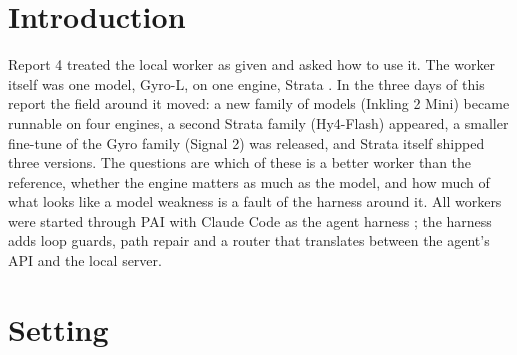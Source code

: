 \clearpage


\tableofcontents
{}
\listoftables
\clearpage

\renewcommand{\sectionmark}[1]{\markboth{\thesection.\ #1}{\thesection.\ #1}}
\renewcommand{\subsectionmark}[1]{}
\clearpage


\section{Introduction}\label{sec:intro}

Report 4 treated the local worker as given and asked how to use it. The worker itself was one model, Gyro-L, on one
engine, Strata \citep{Strata-2026aa}. In the three days of this report the field around it moved: a new family of
models (Inkling 2 Mini) became runnable on four engines, a second Strata family (Hy4-Flash) appeared, a smaller
fine-tune of the Gyro family (Signal 2) was released, and Strata itself shipped three versions. The questions are
which of these is a better worker than the reference, whether the engine matters as much as the model, and how much
of what looks like a model weakness is a fault of the harness around it. All workers were started through PAI
\citep{Nott-2026aa} with Claude Code as the agent harness \citep{Anthropic-2026aa}; the harness adds loop guards, path
repair and a router that translates between the agent's API and the local server.

\section{Setting}\label{sec:setting}

